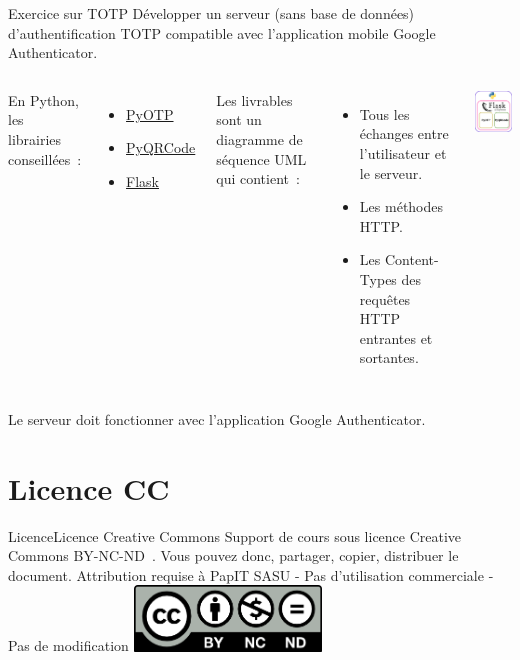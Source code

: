 \documentclass{beamer}
\begin{document}
    \begin{frame}{Exercice \execcounterdispinc sur TOTP}
        Développer un serveur (sans base de données) d'authentification TOTP compatible avec l'application mobile Google Authenticator.
        \bigbreak
        \begin{columns}
            En Python, les librairies conseillées~:
            \begin{itemize}
                \item \href{https://pyauth.github.io/pyotp/}{PyOTP}
                \item \href{https://pythonhosted.org/PyQRCode/}{PyQRCode}
                \item \href{https://flask.palletsprojects.com/en/3.0.x/}{Flask}
            \end{itemize}
            Les livrables sont un diagramme de séquence UML qui contient~:
            \begin{itemize}
                \item Tous les échanges entre l'utilisateur et le serveur.
                \item Les méthodes HTTP.
                \item Les Content-Types des requêtes HTTP entrantes et sortantes.
            \end{itemize}
            \begin{center}
                \includegraphics[width=4cm]{image/totp-server.drawio}
            \end{center}
        \end{columns}
        \bigbreak
        Le serveur doit fonctionner avec l'application Google Authenticator.
    \end{frame}


    \section{Licence CC}\label{sec:licence}

    \begin{frame}{Licence}{Licence Creative Commons}
        Support de cours sous licence Creative Commons BY-NC-ND~.
        \bigbreak
        Vous pouvez donc, partager, copier, distribuer le document.
        \bigbreak
        Attribution requise à PapIT SASU - Pas d’utilisation commerciale - Pas de modification
        \bigbreak
        \centering
        \includegraphics[width=5cm]{image/by-nc-nd-logo}
    \end{frame}
\end{document}
